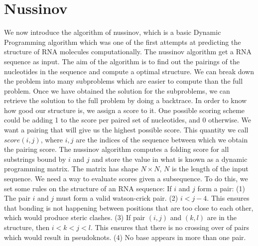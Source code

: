 \section{Nussinov}
\label{sec:nussinov}
We now introduce the algorithm of nussinov,
which is a basic Dynamic Programming algorithm which was one of the first attempts at predicting the structure of RNA molecules computationally.
The nussinov algorithm get a RNA sequence as input.
The aim of the algorithm is to find out the pairings of the nucleotides in the sequence and compute a optimal structure.
We can break down the problem into many subproblems which are easier to compute than the full problem. Once we have obtained the solution for the subproblems,
we can retrieve the solution to the full problem by doing a backtrace.
In order to know how good our structure is, we assign a score to it.
One possible scoring scheme could be adding 1 to the score per paired set of nucleotides,
and 0 otherwise. We want a pairing that will give us the highest possible score.
This quantity we call $score(i,j)$, where $i,j$ are the indices of the sequence between which we obtain the pairing score.
The nussinov algorithm computes a folding score for all substrings
bound by $i$ and $j$ and store the value in what is known as a
dynamic programming matrix. The matrix has shape $N \times N$, $N$ is the length of the input sequence.
We need a way to evaluate scores given a subsequence. To do this, we set some rules on the structure of an RNA sequence:
If $i$ and $j$ form a pair:
(1) The pair $i$ and $j$ must form a valid watson-crick pair.
(2) $i<j-4$. This ensures that bonding is not happening between positions that are too close to each other, which would produce steric clashes.
(3) If pair $(i,j)$ and $(k,l)$ are in the structure, then $i<k<j<l$. This ensures that there is no crossing over of pairs which would result in pseudoknots.
(4) No base appears in more than one pair.

